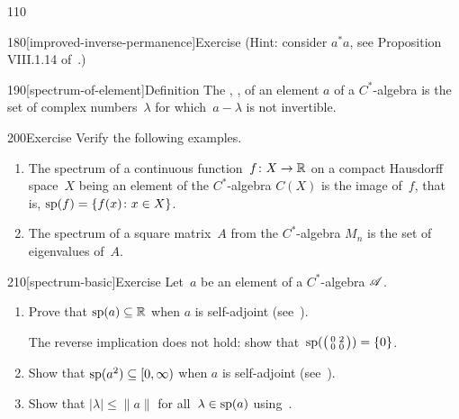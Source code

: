 \begin{parsec}{110}
\begin{point}{180}[improved-inverse-permanence]{Exercise}
(Hint: consider $a^*a$, see Proposition VIII.1.14 of~\cite{conway2013}.)
\end{point}
\begin{point}{190}[spectrum-of-element]{Definition}%
The ,
,%
of an element $a$
of a $C^*$-algebra
is the set 
of complex numbers~$\lambda$
for which~$a-\lambda$ is not invertible.
\end{point}
\begin{point}{200}{Exercise}%
Verify the following examples.
\begin{enumerate}
\item
The spectrum of a continuous function~$f\colon X\to \mathbb{R}$
on a compact Hausdorff space~$X$
being an element of the $C^*$-algebra $C(X)$
is the image of~$f$, that is,
$\mathrm{sp}(f) = \{f(x)\colon x\in X\}$.
\item
The spectrum of a square matrix~$A$
from the $C^*$-algebra $M_n$
is the set of eigenvalues of~$A$.
\end{enumerate}
\end{point}
\begin{point}{210}[spectrum-basic]{Exercise}%
Let~$a$ be an element of a $C^*$-algebra $\mathscr{A}$.
\begin{enumerate}
\item
Prove that $\mathrm{sp}(a)\subseteq \mathbb{R}$ when $a$ is self-adjoint
(see~).

The reverse implication does not hold:
show that~$\mathrm{sp}(\bigl(
\begin{smallmatrix}0&2\\0&0\end{smallmatrix}\bigr))=\{0\}$.

\item
Show that $\mathrm{sp}(a^2)\subseteq [0,\infty)$ when $a$ is self-adjoint
(see~).

\item
Show that $|\lambda|\leq \|a\|$ for all~$\lambda\in\mathrm{sp}(a)$
using~.


\end{enumerate}
\end{point}
\end{parsec}
